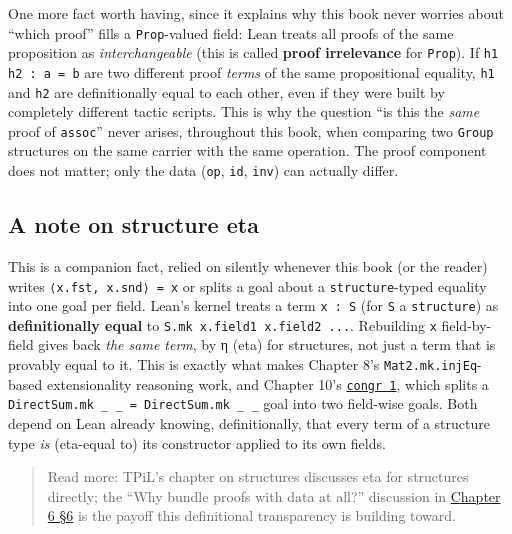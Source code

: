 One more fact worth having, since it explains why this book never worries about ``which proof'' fills a \texttt{Prop}-valued field: Lean treats all proofs of the same proposition as \emph{interchangeable} (this is called \textbf{proof irrelevance} for \texttt{Prop}). If \texttt{h1 h2 : a = b} are two different proof \emph{terms} of the same propositional equality, \texttt{h1} and \texttt{h2} are definitionally equal to each other, even if they were built by completely different tactic scripts. This is why the question ``is this the \emph{same} proof of \texttt{assoc}'' never arises, throughout this book, when comparing two \texttt{Group} structures on the same carrier with the same operation. The proof component does not matter; only the data (\texttt{op}, \texttt{id}, \texttt{inv}) can actually differ.

\subsection{A note on structure eta}\label{sec:05-rigor-check:04-defeq-vs-propeq:7}

This is a companion fact, relied on silently whenever this book (or the reader) writes \texttt{⟨x.fst, x.snd⟩ = x} or splits a goal about a \texttt{structure}-typed equality into one goal per field. Lean's kernel treats a term \texttt{x : S} (for \texttt{S} a \texttt{structure}) as \textbf{definitionally equal} to \texttt{S.mk x.field1 x.field2 ...}. Rebuilding \texttt{x} field-by-field gives back \emph{the same term}, by η (eta) for structures, not just a term that is provably equal to it. This is exactly what makes Chapter 8's \texttt{Mat2.mk.injEq}-based extensionality reasoning work, and Chapter 10's \href{https://lean-lang.org/doc/reference/latest/Tactic-Proofs/Tactic-Reference/}{\texttt{congr 1}}, which splits a \texttt{DirectSum.mk \_\allowbreak{} \_\allowbreak{} = DirectSum.mk \_\allowbreak{} \_\allowbreak{}} goal into two field-wise goals. Both depend on Lean already knowing, definitionally, that every term of a structure type \emph{is} (eta-equal to) its constructor applied to its own fields.

\begin{quote}
Read more: TPiL's chapter on structures discusses eta for structures directly; the ``Why bundle proofs with data at all?'' discussion in \hyperref[sec:06-groups:06-why-bundle:1]{Chapter 6 §6} is the payoff this definitional transparency is building toward.
\end{quote}

